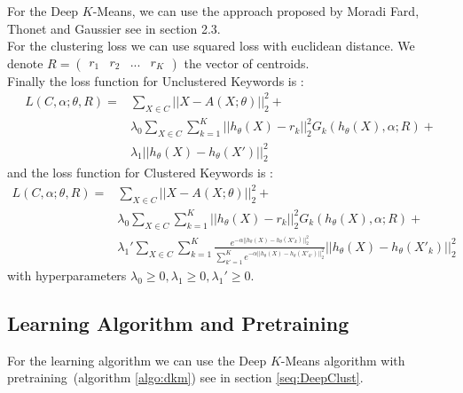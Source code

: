 For the Deep $K$-Means, we can use the approach proposed by Moradi Fard, Thonet and Gaussier 
\cite{Deap-K-Means} see in section 2.3.\\
For the clustering loss we can use squared loss with euclidean distance. We
denote $R = \begin{pmatrix} r_1 & r_2 & ... & r_K\end{pmatrix}$ the vector of
centroids.\\
Finally the loss function for Unclustered Keywords is :
\begin{equation}
\begin{array}{ll}
L(C ,\alpha;\theta,R) = &\sum\limits_{X \in C} ||X - A(X;\theta)||_2^2 + \\ 
&\lambda_0 \sum\limits_{X \in C}\sum\limits_{k=1}^K||h_\theta(X) - r_k ||_2^2 G_{k}(h_\theta(X), \alpha; R) + \\ &
\lambda_1|| h_\theta(X) - h_\theta(X')||_2^2
\end{array}
\end{equation}
and the loss function for Clustered Keywords is :
\begin{equation}
\begin{array}{ll}
L(C ,\alpha;\theta,R) = & \sum\limits_{X \in C} ||X - A(X;\theta)||_2^2 + 
\\ & \lambda_0 \sum\limits_{X \in C}\sum\limits_{k=1}^K||h_\theta(X) - r_k ||_2^2 G_{k}(h_\theta(X), \alpha; R) + 
\\ & \lambda_1'\sum\limits_{X \in C} \sum\limits_{k = 1}^K \frac{e^{-\alpha|| h_\theta(X) - 
h_\theta(X'_k)||_2^2}}{\sum\limits_{k' = 1}^K e^{-\alpha|| h_\theta(X) - 
h_\theta(X'_{k'})||_2^2}}|| h_\theta(X) - h_\theta(X'_{k})||_2^2
\end{array}
\end{equation}
with hyperparameters $\lambda_0 \geq 0, \lambda_1 \geq 0, \lambda_1' \geq 0$.\\

\subsection{Learning Algorithm and Pretraining}

For the learning algorithm we can use the Deep $K$-Means algorithm with 
pretraining~(algorithm \ref{algo:dkm}) see in section \ref{seq:DeepClust}. 
 

